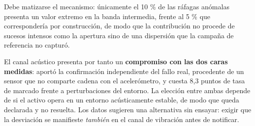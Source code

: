 Debe matizarse el mecanismo: únicamente el 10 \% de las ráfagas anómalas presenta un valor
extremo en la banda intermedia, frente al 5 \% que correspondería por construcción, de modo que
la contribución no procede de sucesos intensos como la apertura sino de una dispersión que la
campaña de referencia no capturó.

El canal acústico presenta por tanto un \textbf{compromiso con las dos caras medidas}: aportó la
confirmación independiente del fallo real, procedente de un sensor que no comparte cadena con el
acelerómetro, y cuesta 8,3 puntos de tasa de marcado frente a perturbaciones del entorno. La
elección entre ambas depende de si el activo opera en un entorno acústicamente estable, de modo
que queda declarada y no resuelta. Los datos sugieren una alternativa sin ensayar: exigir que la
desviación se manifieste \textit{también} en el canal de vibración antes de notificar.

